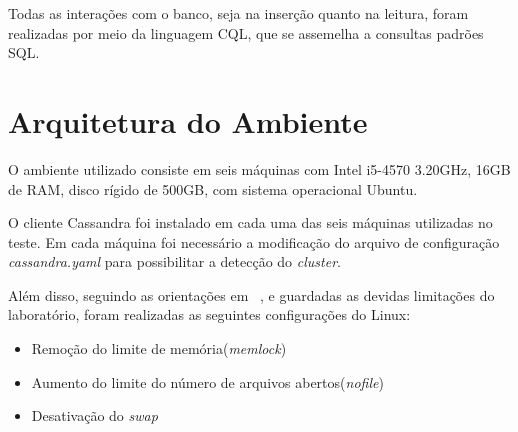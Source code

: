 Todas as interações com o banco, seja na inserção quanto na leitura, foram realizadas por meio da linguagem CQL, que se assemelha a consultas padrões SQL.

\section{Arquitetura do Ambiente}
O ambiente utilizado consiste em seis máquinas com Intel i5-4570 3.20GHz, 16GB de RAM, disco rígido de 500GB, com sistema operacional Ubuntu.

O cliente Cassandra foi instalado em cada uma das seis máquinas utilizadas no teste. Em cada máquina foi necessário a modificação do arquivo de configuração \emph{cassandra.yaml} para possibilitar a detecção do \emph{cluster}.

Além disso, seguindo as orientações em ~\cite{cassandrasettings}, e guardadas as devidas limitações do laboratório, foram realizadas as seguintes configurações do Linux:
\begin{itemize}
	\item Remoção do limite de memória(\emph{memlock})
	\item Aumento do limite do número de arquivos abertos(\emph{nofile})
	\item Desativação do \emph{swap}
\end{itemize}




